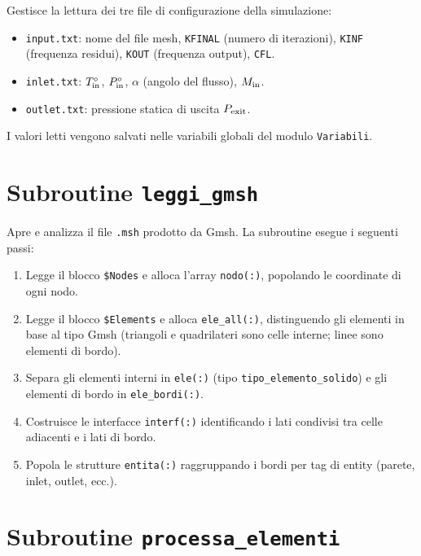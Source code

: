 Gestisce la lettura dei tre file di configurazione della simulazione:
\begin{itemize}
    \item \texttt{input.txt}: nome del file mesh, \texttt{KFINAL}
          (numero di iterazioni), \texttt{KINF} (frequenza residui),
          \texttt{KOUT} (frequenza output), \texttt{CFL}.
    \item \texttt{inlet.txt}: $T^\circ_{\rm in}$, $P^\circ_{\rm in}$,
          $\alpha$ (angolo del flusso), $M_{\rm in}$.
    \item \texttt{outlet.txt}: pressione statica di uscita $P_{\rm exit}$.
\end{itemize}
I valori letti vengono salvati nelle variabili globali del modulo
\texttt{Variabili}.

\section{Subroutine \texttt{leggi\_gmsh}}

Apre e analizza il file \texttt{.msh} prodotto da Gmsh.
La subroutine esegue i seguenti passi:
\begin{enumerate}
    \item Legge il blocco \texttt{\$Nodes} e alloca l'array \texttt{nodo(:)},
          popolando le coordinate di ogni nodo.
    \item Legge il blocco \texttt{\$Elements} e alloca \texttt{ele\_all(:)},
          distinguendo gli elementi in base al tipo Gmsh (triangoli e
          quadrilateri sono celle interne; linee sono elementi di bordo).
    \item Separa gli elementi interni in \texttt{ele(:)} (tipo
          \texttt{tipo\_elemento\_solido}) e gli elementi di bordo in
          \texttt{ele\_bordi(:)}.
    \item Costruisce le interfacce \texttt{interf(:)} identificando i lati
          condivisi tra celle adiacenti e i lati di bordo.
    \item Popola le strutture \texttt{entita(:)} raggruppando i bordi per
          tag di entity (parete, inlet, outlet, ecc.).
\end{enumerate}

\section{Subroutine \texttt{processa\_elementi}}

